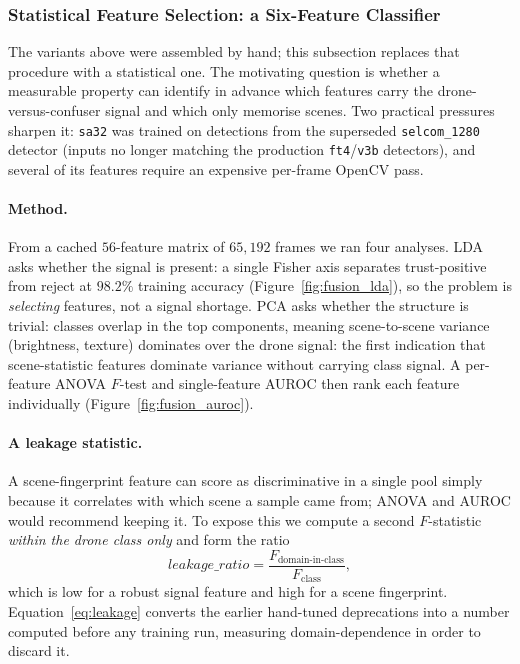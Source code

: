 \subsubsection{Statistical Feature Selection: a Six-Feature Classifier}
\label{sec:feature_selection}

The variants above were assembled by hand; this subsection replaces that procedure with a statistical one. The motivating question is whether a measurable property can identify in advance which features carry the drone-versus-confuser signal and which only memorise scenes. Two practical pressures sharpen it: \texttt{sa32} was trained on detections from the superseded \texttt{selcom\_1280} detector (inputs no longer matching the production \texttt{ft4}/\texttt{v3b} detectors), and several of its features require an expensive per-frame OpenCV pass.

\paragraph{Method.}
From a cached $56$-feature matrix of $65{,}192$ frames we ran four analyses. LDA asks whether the signal is present: a single Fisher axis separates trust-positive from reject at $98.2\%$ training accuracy (Figure~\ref{fig:fusion_lda}), so the problem is \emph{selecting} features, not a signal shortage. PCA asks whether the structure is trivial: classes overlap in the top components, meaning scene-to-scene variance (brightness, texture) dominates over the drone signal: the first indication that scene-statistic features dominate variance without carrying class signal. A per-feature ANOVA $F$-test and single-feature AUROC then rank each feature individually (Figure~\ref{fig:fusion_auroc}).

\paragraph{A leakage statistic.}
A scene-fingerprint feature can score as discriminative in a single pool simply because it correlates with which scene a sample came from; ANOVA and AUROC would recommend keeping it. To expose this we compute a second $F$-statistic \emph{within the drone class only} and form the ratio
\begin{equation}
\mathit{leakage\_ratio} = \frac{F_\text{domain-in-class}}{F_\text{class}},
\label{eq:leakage}
\end{equation}
which is low for a robust signal feature and high for a scene fingerprint. Equation~\ref{eq:leakage} converts the earlier hand-tuned deprecations into a number computed before any training run, measuring domain-dependence in order to discard it.

